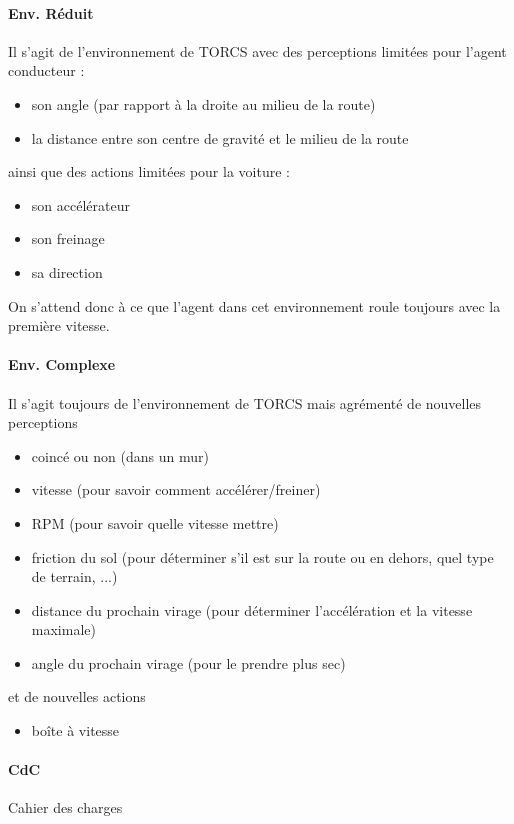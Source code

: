 \documentclass[a4paper,12pt]{article}
\begin{document}
  \paragraph{Env. Réduit} Il s'agit de l'environnement de TORCS avec des perceptions limitées pour l'agent conducteur :
    \begin{itemize}
     \item son angle (par rapport à la droite au milieu de la route)
     \item la distance entre son centre de gravité et le milieu de la route
     \end{itemize}
     ainsi que des actions limitées pour la voiture :
    \begin{itemize}
    \item son accélérateur
    \item son freinage
    \item sa direction
    \end{itemize}
    On s'attend donc à ce que l'agent dans cet environnement roule toujours avec la première vitesse.
  
  \paragraph{Env. Complexe}Il s'agit toujours de l'environnement de TORCS mais agrémenté de nouvelles perceptions
    \begin{itemize}
     \item coincé ou non (dans un mur)
     \item vitesse (pour savoir comment accélérer/freiner)
     \item RPM (pour savoir quelle vitesse mettre)
     \item friction du sol (pour déterminer s'il est sur la route ou en dehors, quel type de terrain, ...)
     \item distance du prochain virage (pour déterminer l'accélération et la vitesse maximale)
     \item angle du prochain virage (pour le prendre plus sec)
    \end{itemize}
    et de nouvelles actions
    \begin{itemize}
     \item boîte à vitesse
    \end{itemize}
    
   \paragraph{CdC} Cahier des charges
   
\end{document}
